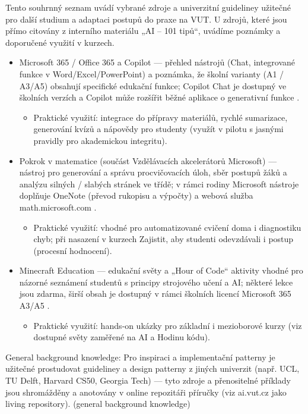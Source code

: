 Tento souhrnný seznam uvádí vybrané zdroje a univerzitní guideliney užitečné pro další studium a adaptaci postupů do praxe na VUT. U zdrojů, které jsou přímo citovány z interního materiálu „AI – 101 tipů“, uvádíme poznámky a doporučené využití v kurzech.

\begin{itemize}
  \item Microsoft 365 / Office 365 a Copilot — přehled nástrojů (Chat, integrované funkce v Word/Excel/PowerPoint) a poznámka, že školní varianty (A1 / A3/A5) obsahují specifické edukační funkce; Copilot Chat je dostupný ve školních verzích a Copilot může rozšířit běžné aplikace o generativní funkce \cite{kb_ai_101_tipu_pdf_04e4a115_page_3_1}.
    \begin{itemize}
      \item Praktické využití: integrace do přípravy materiálů, rychlé sumarizace, generování kvízů a nápovědy pro studenty (využít v pilotu s jasnými pravidly pro akademickou integritu). %
    \end{itemize}

  \item Pokrok v matematice (součást Vzdělávacích akcelerátorů Microsoft) — nástroj pro generování a správu procvičovacích úloh, sběr postupů žáků a analýzu silných / slabých stránek ve třídě; v rámci rodiny Microsoft nástroje doplňuje OneNote (převod rukopisu a výpočty) a webová služba math.microsoft.com \cite{kb_ai_101_tipu_pdf_04e4a115_page_8_1}.
    \begin{itemize}
      \item Praktické využití: vhodné pro automatizované cvičení doma i diagnostiku chyb; při nasazení v kurzech Zajistit, aby studenti odevzdávali i postup (procesní hodnocení).
    \end{itemize}

  \item Minecraft Education — edukační světy a „Hour of Code“ aktivity vhodné pro názorné seznámení studentů s principy strojového učení a AI; některé lekce jsou zdarma, širší obsah je dostupný v rámci školních licencí Microsoft 365 A3/A5 \cite{kb_ai_101_tipu_pdf_04e4a115_page_15_2}.
    \begin{itemize}
      \item Praktické využití: hands‑on ukázky pro základní i mezioborové kurzy (viz dostupné světy zaměřené na AI a Hodinu kódu).
    \end{itemize}
\end{itemize}

General background knowledge: Pro inspiraci a implementační patterny je užitečné prostudovat guideliney a design patterny z jiných univerzit (např. UCL, TU Delft, Harvard CS50, Georgia Tech) — tyto zdroje a přenositelné příklady jsou shromážděny a anotovány v online repozitáři příručky (viz ai.vut.cz jako living repository). (general background knowledge)
